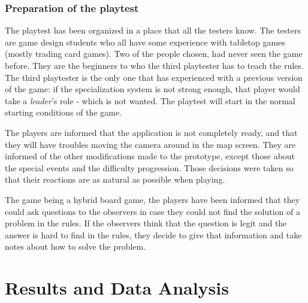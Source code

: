 \subsubsection{Preparation of the playtest}
The playtest has been organized in a place that all the testers know. The testers are game design students who all have  some experience with tabletop games (mostly trading card games). Two of the people chosen, had never seen the game before. They are the beginners to who the third playtester has to teach the rules. The third playtester is the only one that has experienced with a previous version of the game: if the specialization system is not strong enough, that player would take a \textit{leader}'s role - which is not wanted. The playtest will start in the normal starting conditions of the game.

The players are informed that the application is not completely ready, and that they will have troubles moving the camera around in the map screen. They are informed of the other modifications made to the prototype, except those about the special events and the difficulty progression. Those decisions were taken so that their reactions are as natural as possible when playing.

The game being a hybrid board game, the players have been informed that they could ask questions to the observers in case they could not find the solution of a problem in the rules. If the observers think that the question is legit and the answer is hard to find in the rules, they decide to give that information and take notes about how to solve the problem. 

\section{Results and Data Analysis}


